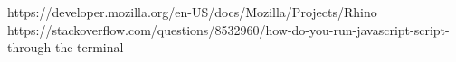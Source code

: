 https://developer.mozilla.org/en-US/docs/Mozilla/Projects/Rhino
https://stackoverflow.com/questions/8532960/how-do-you-run-javascript-script-through-the-terminal